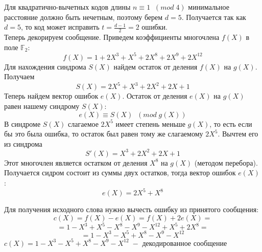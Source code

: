 \documentclass[12pt]{article}
\begin{document}
\begin{flushleft}
    Для квадратично-вычетных кодов длины $n \equiv 1 \; \; (mod \; 4)$ минимальное расстояние должно быть нечетным, поэтому берем $d = 5$. Получается так как $d = 5$, то код может исправить $t = \frac{d - 1}{2} = 2$ ошибки. \\
    Теперь декорируем сообщение. Приведем коэффициенты многочлена $f(X)$ в поле $\mathbb{F}_2$:
    \[ f(X) = 1 + 2X^3 + X^5 + 2X^8 + 2X^9 + 2X^{12} \]
    Для нахождения синдрома $S(X)$ найдем остаток от деления $f(X)$ на $g(X)$. Получаем
    \[ S(X) = 2X^5 + X^3 + 2X^2 + 2X + 1 \]
    Теперь найдем вектор ошибок $e(X)$. Остаток от деления $e(X)$ на $g(X)$ равен нашему синдрому $S(X)$:
    \[ e(X) \equiv S(X) \; \; (mod \; g(X)) \]
    В синдроме $S(X)$ слагаемое $2X^5$ имеет степень меньше $g(X)$, то есть если бы это была ошибка, то остаток был равен тому же слагаемому $2X^5$. Вычтем его из синдрома
    \[ S'(X) = X^3 + 2X^2 + 2X + 1 \]
    Этот многочлен является остатком от деления $X^8$ на $g(X)$ (методом перебора). Получается сидром состоит из суммы двух остатков, тогда вектор ошибок $e(X)$:
    \[ e(X) = 2X^5 + X^8 \]

    Для получения исходного слова нужно вычесть ошибку из принятого сообщения:
    \[ c(X) = f(X) - e(X) = f(X) + 2e(X) = \]
    \[ = 1 - X^3 + X^5 - X^8 - X^9 - X^{12} + X^5 + 2X^8 = \]
    \[ = 1 - X^3 - X^5 + X^8 - X^9 - X^{12} \]
    $c(X) = 1 - X^3 - X^5 + X^8 - X^9 - X^{12} \; -$ декодированное сообщение

\end{flushleft}
\end{document}
